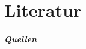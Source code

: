 %
%

\if@mainmatter
\backmatter
\fi

\ifx\bibliocommand\undefined
\else
	\part{Literatur}
	\begin{frame}[allowframebreaks]
	\frametitle{Quellen}
	
	\def\newblock{}
	\bibliocommand
	\end{frame}
\fi
